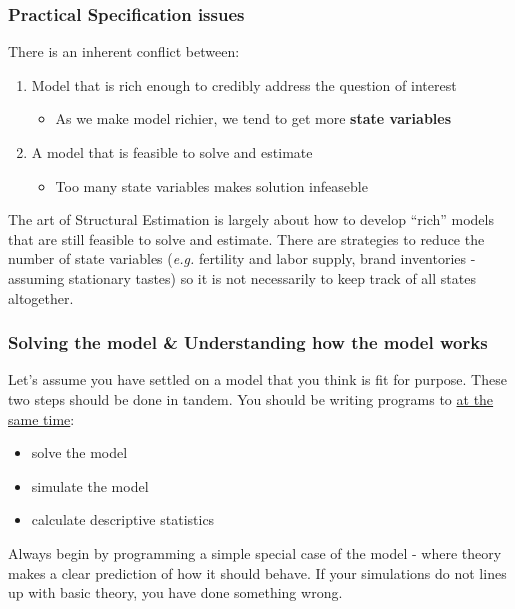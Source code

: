 \documentclass[11pt]{article}
\begin{document}
\subsubsection{Practical Specification issues}
\label{sec:orga0f2b2d}

There is an inherent conflict between:

\begin{enumerate}
\item Model that is rich enough to credibly address the question of interest
\begin{itemize}
\item As we make model richier, we tend to get more \textbf{state variables}
\end{itemize}
\item A model that is feasible to solve and estimate
\begin{itemize}
\item Too many state variables makes solution infeaseble
\end{itemize}
\end{enumerate}


The art of Structural Estimation is largely about how to develop ``rich'' models that are still feasible to solve and estimate. There are strategies to reduce the number of state variables (\emph{e.g.} fertility and labor supply, brand inventories - assuming stationary tastes) so it is not necessarily to keep track of all states altogether.

\subsubsection{Solving the model \& Understanding how the model works}
\label{sec:org784f19f}


Let's assume you have settled on a model that you think is fit for purpose. These two steps should be done in tandem. You should be writing programs to \uline{at the same time}:

\begin{itemize}
\item solve the model
\item simulate the model
\item calculate descriptive statistics
\end{itemize}

Always begin by programming a simple special case of the model - where theory makes a clear prediction of how it should behave. If your simulations do not lines up with basic theory, you have done something wrong.
\end{document}
